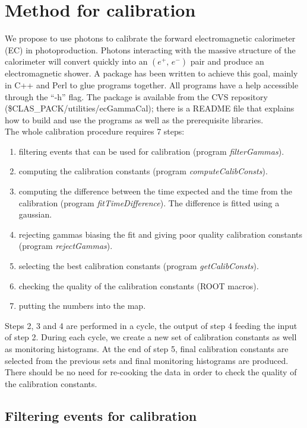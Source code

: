 \documentclass [12pt,letterpaper]{article}
\begin{document}
\section{Method for calibration}
We propose to use photons to calibrate the forward electromagnetic calorimeter (EC) in photoproduction. Photons interacting with the massive structure of the calorimeter will convert quickly into an $(e^{+},\,e^{-})$ pair and produce an electromagnetic shower. A package has been written to achieve this goal, mainly in C++ and Perl to glue programs together. All programs have a help accessible through the ``-h'' flag. The package is available from the CVS repository (\$CLAS\_PACK/utilities/ecGammaCal); there is a README file that explains how to build and use the programs as well as the prerequisite libraries.\\
 
The whole calibration procedure requires 7 steps:

\begin{enumerate}
\item filtering events that can be used for calibration (program {\it filterGammas}).
\item computing the calibration constants (program {\it computeCalibConsts}).
\item computing the difference between the time expected and the time from the calibration (program {\it fitTimeDifference}). The difference is fitted using a gaussian.
\item rejecting gammas biasing the fit and giving poor quality calibration constants (program {\it rejectGammas}).
\item selecting the best calibration constants (program {\it getCalibConsts}).
\item checking the quality of the calibration constants (ROOT macros). 
\item putting the numbers into the map.
\end{enumerate} 

Steps 2, 3 and 4 are performed in a cycle, the output of step 4 feeding the input of step 2. During each cycle, we create a new set of calibration constants as well as monitoring histograms. At the end of step 5, final calibration constants are selected from the previous sets and final monitoring histograms are produced. There should be no need for re-cooking the data in order to check the quality of the calibration constants.


\subsection{Filtering events for calibration}
\end{document}
